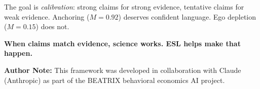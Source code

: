 The goal is \emph{calibration}: strong claims for strong evidence, tentative claims for weak evidence. Anchoring ($M = 0.92$) deserves confident language. Ego depletion ($M = 0.15$) does not.

\textbf{When claims match evidence, science works. ESL helps make that happen.}

\vspace{2em}
\noindent\textbf{Author Note:} This framework was developed in collaboration with Claude (Anthropic) as part of the BEATRIX behavioral economics AI project.



\newpage


